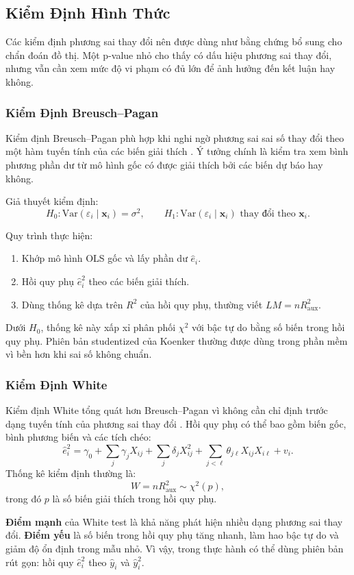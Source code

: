 \subsection{Kiểm Định Hình Thức}

Các kiểm định phương sai thay đổi nên được dùng như bằng chứng bổ sung cho chẩn đoán đồ thị. Một p-value nhỏ cho thấy có dấu hiệu phương sai thay đổi, nhưng vẫn cần xem mức độ vi phạm có đủ lớn để ảnh hưởng đến kết luận hay không.

\subsubsection{Kiểm Định Breusch--Pagan}

Kiểm định Breusch--Pagan phù hợp khi nghi ngờ phương sai sai số thay đổi theo một hàm tuyến tính của các biến giải thích \cite{breusch1979}. Ý tưởng chính là kiểm tra xem bình phương phần dư từ mô hình gốc có được giải thích bởi các biến dự báo hay không.

Giả thuyết kiểm định:
\[
  H_0: \mathrm{Var}(\varepsilon_i\mid\mathbf{x}_i)=\sigma^2,
  \qquad
  H_1: \mathrm{Var}(\varepsilon_i\mid\mathbf{x}_i)\text{ thay đổi theo }\mathbf{x}_i.
\]

Quy trình thực hiện:
\begin{enumerate}
  \item Khớp mô hình OLS gốc và lấy phần dư $\hat e_i$.
  \item Hồi quy phụ $\hat e_i^2$ theo các biến giải thích.
  \item Dùng thống kê dựa trên $R^2$ của hồi quy phụ, thường viết $LM=nR^2_{\mathrm{aux}}$.
\end{enumerate}

Dưới $H_0$, thống kê này xấp xỉ phân phối $\chi^2$ với bậc tự do bằng số biến trong hồi quy phụ. Phiên bản studentized của Koenker \cite{koenker1981} thường được dùng trong phần mềm vì bền hơn khi sai số không chuẩn.

\subsubsection{Kiểm Định White}

Kiểm định White tổng quát hơn Breusch--Pagan vì không cần chỉ định trước dạng tuyến tính của phương sai thay đổi \cite{white1980}. Hồi quy phụ có thể bao gồm biến gốc, bình phương biến và các tích chéo:
\[
  \hat e_i^2
  = \gamma_0
    + \sum_j \gamma_j X_{ij}
    + \sum_j \delta_j X_{ij}^2
    + \sum_{j<\ell}\theta_{j\ell}X_{ij}X_{i\ell}
    + v_i.
\]
Thống kê kiểm định thường là:
\[
  W = nR^2_{\mathrm{aux}} \sim \chi^2(p),
\]
trong đó $p$ là số biến giải thích trong hồi quy phụ.

\textbf{Điểm mạnh} của White test là khả năng phát hiện nhiều dạng phương sai thay đổi. \textbf{Điểm yếu} là số biến trong hồi quy phụ tăng nhanh, làm hao bậc tự do và giảm độ ổn định trong mẫu nhỏ. Vì vậy, trong thực hành có thể dùng phiên bản rút gọn: hồi quy $\hat e_i^2$ theo $\hat y_i$ và $\hat y_i^2$.

